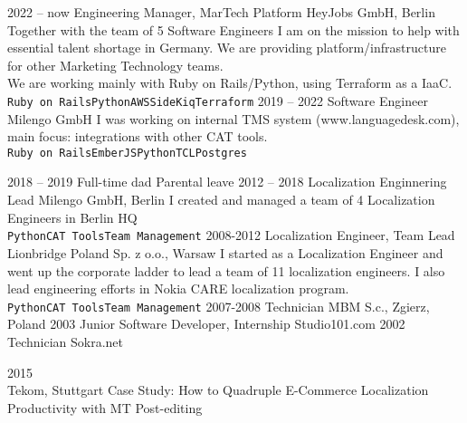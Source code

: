 \documentclass[8pt]{developercv} %
\begin{document}
\begin{entrylist}
	\entry
		{2022 -- now}
		{Engineering Manager, MarTech Platform}
		{HeyJobs GmbH, Berlin}
		{Together with the team of 5 Software Engineers I am on the mission to help with essential talent shortage in Germany. We are providing platform/infrastructure for other Marketing Technology teams.\\ We are working mainly with Ruby on Rails/Python, using Terraform as a IaaC.
		\\ \texttt{Ruby on Rails}\slashsep\texttt{Python}\slashsep\texttt{AWS}\slashsep\texttt{SideKiq}\slashsep\texttt{Terraform}}
	\entry
		{2019 -- 2022}
		{Software Engineer}
		{Milengo GmbH}
		{I was working on internal TMS system (www.languagedesk.com), main focus: integrations with other CAT tools.
			\\ \texttt{Ruby on Rails}\slashsep\texttt{EmberJS}\slashsep\texttt{Python}\slashsep\texttt{TCL}\slashsep\texttt{Postgres}}
	
	\entry
		{2018 -- 2019}
		{Full-time dad}
		{Parental leave}
		{}
	\entry
		{2012 -- 2018}
		{Localization Enginnering Lead}
		{Milengo GmbH, Berlin}
		{I created and managed a team of 4 Localization Engineers in Berlin HQ
		\\ \texttt{Python}\slashsep\texttt{CAT Tools}\slashsep\texttt{Team Management}}
	\entry
		{2008-2012}
		{Localization Engineer, Team Lead}
		{Lionbridge Poland Sp. z o.o., Warsaw}
		{I started as a Localization Engineer and went up the corporate ladder to lead a team of 11 localization engineers.
		I also lead engineering efforts in Nokia CARE localization program.
		\\ \texttt{Python}\slashsep\texttt{CAT Tools}\slashsep\texttt{Team Management}}
	\entry
		{2007-2008}
		{Technician}
		{MBM S.c., Zgierz, Poland }
		{ }
	\entry
		{2003}
		{Junior Software Developer, Internship}
		{Studio101.com }
		{ }
	\entry
		{2002}
		{Technician}
		{Sokra.net }
		{ }
\end{entrylist}


\begin{entrylist}
	\entry
		{2015}
		{ \\ }
		{Tekom, Stuttgart}
		{Case Study: How to Quadruple E-Commerce Localization Productivity with 
		MT Post-editing }
\end{entrylist}



\end{document}
